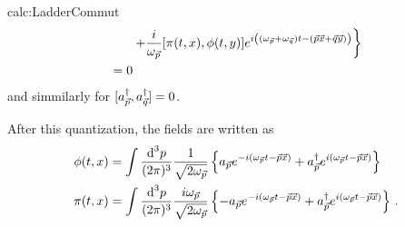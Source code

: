 \begin{calc}{calc:LadderCommut}
\begin{align*}
                                         & \phantom{=}\quad\left.                     +\frac{{i}}{\omega_{\vec{p}}}{[\pi(t,x),\phi(t,y)]}e^{{i}\left((\omega_{\vec{p}}+\omega_{\vec{q}})t-(\vec{p}\vec{x}+\vec{q}\vec{y})\right)}\right\}                                 \\
                                         & =0
    \end{align*}
    and simmilarly for ${[a_{\vec{p}}^\dagger,a_{\vec{q}}^\dagger]}=0$.
\end{calc}

After this quantization, the fields are written as
\begin{subequations}
    \begin{align}
        \phi(t,x)               & =\int\frac{\text{d} ^3p}{(2\pi)^3}\frac{1}{\sqrt{2\omega_{\vec{p}}}}\left\{a_{\vec{p}}e^{-{i}(\omega_{\vec{p}}t-\vec{p}\vec{x})}+a_{\vec{p}}^\dagger e^{{i}(\omega_{\vec{p}}t-\vec{p}\vec{x})}\right\}                                                 \label{eq:CanonicalQuant_RealScalar}\\
       \pi(t,x) & =\int\frac{\text{d} ^3p}{(2\pi)^3}\frac{{i}\omega_{\vec{p}}}{\sqrt{2\omega_{\vec{p}}}}\left\{-a_{\vec{p}}e^{-{i}(\omega_{\vec{p}}t-\vec{p}\vec{x})}+a_{\vec{p}}^\dagger e^{{i}(\omega_{\vec{p}}t-\vec{p}\vec{x})}\right\}\,.
    \end{align}
\end{subequations}

